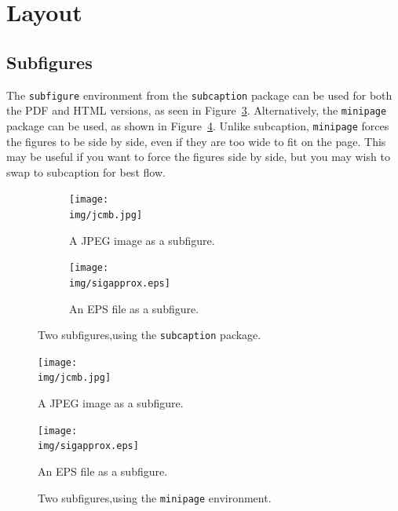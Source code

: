 \section{Layout}

\subsection{Subfigures}
\label{demo:fig:subfig}

The \verb|subfigure| environment from the \verb|subcaption| package can be used for both the PDF and HTML versions, as seen in Figure~\ref{fig:subs}. Alternatively, the \verb|minipage| package can be used, as shown in Figure~\ref{fig:minpage}. Unlike subcaption, \verb|minipage| forces the figures to be side by side, even if they are too wide to fit on the page. This may be useful if you want to force the figures side by side, but you may wish to swap to subcaption for best flow. 

\begin{figure}[H]
    \centering

    \begin{subfigure}{0.35\textwidth}
        \texttt{[image: \\img/jcmb.jpg]}
        \caption{A JPEG image as a subfigure.}
        \label{fig:jcmb}
    \end{subfigure}
    \hfill
    \begin{subfigure}{0.6\textwidth}
        \texttt{[image: \\img/sigapprox.eps]}
        \caption{An EPS file as a subfigure.}
        \label{fig:sig}
    \end{subfigure}
    \caption{Two subfigures,using the \texttt{subcaption} package.}
    \label{fig:subs}
\end{figure}



\begin{figure}[H]
    \centering
    \begin{minipage}{.35\textwidth}
        \centering
        \texttt{[image: \\img/jcmb.jpg]}
        \caption{A JPEG image as a subfigure.}
        \label{fig:mp-jcmb}
    \end{minipage}%
    \begin{minipage}{0.6\textwidth}
        \centering
        \texttt{[image: \\img/sigapprox.eps]}
        \caption{An EPS file as a subfigure.}
        \label{fig:mp-sig}
    \end{minipage}
    \caption{Two subfigures,using the \texttt{minipage} environment.}
    \label{fig:minpage}
\end{figure}


